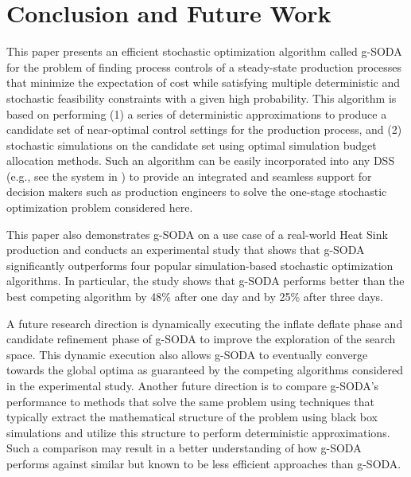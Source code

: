 \documentclass[a4paper, 12pt]{article} %
\begin{document}
\section{Conclusion and Future Work}
\label{sec:conclusion}

This paper presents an efficient stochastic optimization algorithm called g-SODA for the problem of finding process controls of a steady-state production processes that minimize the expectation of cost while satisfying multiple deterministic and stochastic feasibility constraints with a given high probability. 
This algorithm is based on performing (1) a series of deterministic approximations to produce a candidate set of near-optimal control settings for the production process, and (2) stochastic simulations on the candidate set using optimal simulation budget allocation methods.  
Such an algorithm can be easily incorporated into any DSS (e.g., see the system in \cite{Brodsky2017ieeebd}) to provide an integrated and seamless support for decision makers such as production engineers to solve the one-stage stochastic optimization problem considered here.

This paper also demonstrates g-SODA on a use case of a real-world Heat Sink production and  conducts an experimental study that shows that g-SODA significantly outperforms four popular simulation-based stochastic optimization algorithms. In particular, the study shows that g-SODA performs better than the best competing algorithm by 48\% after one day and by 25\% after three days.

A future research direction is dynamically executing the inflate deflate phase and candidate refinement phase of g-SODA to improve the exploration of the search space. This dynamic execution also allows g-SODA to eventually converge towards the global optima as guaranteed by the competing algorithms considered in the experimental study. Another future direction is to compare g-SODA's performance to methods that solve the same problem using techniques that typically extract the mathematical structure of the problem using black box simulations and utilize this structure to perform deterministic approximations. Such a comparison may result in a better understanding of how g-SODA performs against similar but known to be less efficient approaches than g-SODA. 

 

\end{document}
